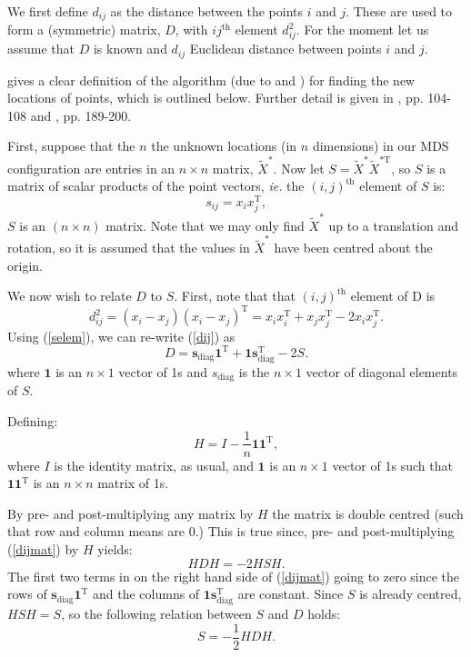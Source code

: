 \documentclass[a4paper,10pt]{article}
\newcommand{\eqn}[1]{(\ref{#1})}
\newcommand{\tr}[1]{#1^{\text{T}}}
\newcommand{\cross}{\times}
\begin{document}
We first define $d_{ij}$ as the distance between the points $i$ and $j$. These are used to form a (symmetric) matrix, $D$, with $ij^{\text{th}}$ element $d^2_{ij}$. For the moment let us assume that $D$ is known and $d_{ij}$ Euclidean distance between points $i$ and $j$. 

\cite{diaconis08} gives a clear definition of the algorithm (due to \cite{schoenberg35} and \cite{torgerson}) for finding the new locations of points, which is outlined below. Further detail is given in \cite{principlesofMA}, pp. 104-108 and \cite{chatfieldcollins}, pp. 189-200.

First, suppose that the $n$ the unknown locations (in $n$ dimensions) in our MDS configuration are entries in an $n \times n$ matrix, $\tilde{X}^*$. Now let $S=\tilde{X}^{*} \tilde{X}^{*\text{T}} $, so $S$ is a matrix of scalar products of the point vectors, \emph{ie.} the $(i,j)^\text{th}$ element of $S$ is:
\begin{equation}
s_{ij} = x_i\tr{x_j},
\label{selem}
\end{equation}
$S$ is an $(n\cross n)$ matrix. Note that we may only find $\tilde{X}^*$ up to a translation and rotation, so it is assumed that the values in $\tilde{X}^*$ have been centred about the origin.

We now wish to relate $D$ to $S$. First, note that that $(i,j)^\text{th}$ element of D is 
\begin{equation}
d_{ij}^2 = (x_i-x_j)\tr{(x_i-x_j)} = x_i\tr{x_i} + x_j\tr{x_j}  -2 x_i\tr{x_j}.
\label{dij}
\end{equation}
Using \eqn{selem}, we can re-write \eqn{dij} as
\begin{equation}
D=\mathbf{s}_\text{diag}\tr{\mathbf{1}} + \mathbf{1}\tr{\mathbf{s}_\text{diag}} -2S.
\label{dijmat}
\end{equation}
where $\mathbf{1}$ is an $n \cross 1$ vector of 1s and $s_\text{diag}$ is the $n \cross 1$ vector of diagonal elements of $S$.

Defining:
\begin{equation}
H = I-\frac{1}{n}\mathbf{1}\tr{\mathbf{1}},
\end{equation}
where $I$ is the identity matrix, as usual, and $\mathbf{1}$ is an $n \cross 1$ vector of 1s such that $\mathbf{1}\tr{\mathbf{1}}$ is an $n \cross n$ matrix of 1s.

By pre- and post-multiplying any matrix by $H$ the matrix is double centred (such that row and column means are 0.) This is true since, pre- and post-multiplying \eqn{dijmat} by $H$ yields:
\begin{equation}
HDH = -2HSH.
\label{eqH}
\end{equation}
The first two terms in on the right hand side of \eqn{dijmat} going to zero since the rows of $\mathbf{s}_\text{diag}\tr{\mathbf{1}}$ and the columns of  $\mathbf{1}\tr{\mathbf{s}_\text{diag}}$ are constant. Since $S$ is already centred, $HSH=S$, so the following relation between $S$ and $D$ holds:
\begin{equation}
S = -\frac{1}{2}HDH.
\label{eqH}
\end{equation}
\end{document}
